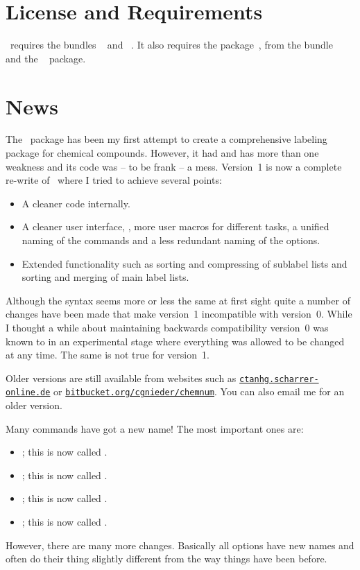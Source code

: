 \documentclass[load-preamble+,babel-options={ngerman,british,american}]{cnltx-doc}
\newcommand*\website[1]{\texttt{\href{http://#1/}{#1}}}
\newcommand*\securewebsite[1]{\texttt{\href{https://#1/}{#1}}}
\begin{document}
\section{License and Requirements}\label{sec:license-requirements}
\license

\chemnum\ requires the bundles ~\cite{bnd:l3kernel} and
~\cite{bnd:l3packages}.  It also requires the
 package~\cite{pkg:translations},  from the
 bundle~\cite{bnd:chemmacros} and the
~\cite{pkg:psfrag} package.

\section{News}\label{sec:news}
The \chemnum\ package has been my first attempt to create a comprehensive
labeling package for chemical compounds.  However, it had and has more than
one weakness and its code was -- to be frank -- a mess.  Version~1 is now a
complete re-write of \chemnum\ where I tried to achieve several points:
\begin{itemize}
  \item A cleaner code internally.
  \item A cleaner user interface, \ie, more user macros for different tasks, a
    unified naming of the commands and a less redundant naming of the
    options.
  \item Extended functionality such as sorting and compressing of sublabel
    lists and sorting and merging of main label lists.
\end{itemize}

Although the syntax seems more or less the same at first sight quite a number
of changes have been made that make version~1 incompatible with version~0.
While I thought a while about maintaining backwards compatibility version~0
was known to in an experimental stage where everything was allowed to be
changed at any time.  The same is not true for version~1.

Older versions are still available from websites such as
\website{ctanhg.scharrer-online.de} or
\securewebsite{bitbucket.org/cgnieder/chemnum}.  You can also email me for an
older version.

Many commands have got a new name! The most important ones are:
\begin{itemize}
  \item {}; this is now called .
  \item {}; this is now called .
  \item {}; this is now called .
  \item {}; this is now called .
\end{itemize}
However, there are many more changes.  Basically all options have new names
and often do their thing slightly different from the way things have been
before.
\end{document}
